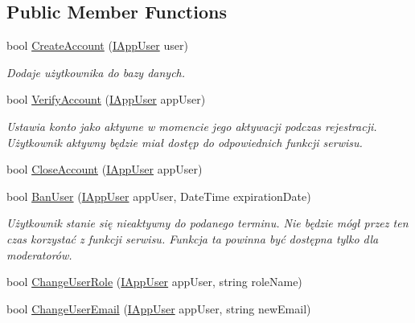 \subsection*{Public Member Functions}
\begin{DoxyCompactItemize}
\item 
bool \hyperlink{class_bibabook_1_1_implementation_1_1_app_user_service_1_1_users_service_a09099199f03613616cbb6b9881e2d613}{Create\+Account} (\hyperlink{interface_contract_1_1_i_app_user}{I\+App\+User} user)
\begin{DoxyCompactList}\small\item\em Dodaje użytkownika do bazy danych. \end{DoxyCompactList}\item 
bool \hyperlink{class_bibabook_1_1_implementation_1_1_app_user_service_1_1_users_service_abfc1fda74aa855425d06128ff4c57d0c}{Verify\+Account} (\hyperlink{interface_contract_1_1_i_app_user}{I\+App\+User} app\+User)
\begin{DoxyCompactList}\small\item\em Ustawia konto jako aktywne w momencie jego aktywacji podczas rejestracji. Użytkownik aktywny będzie miał dostęp do odpowiednich funkcji serwisu. \end{DoxyCompactList}\item 
bool \hyperlink{class_bibabook_1_1_implementation_1_1_app_user_service_1_1_users_service_a2467be014a736abc21385626434d390b}{Close\+Account} (\hyperlink{interface_contract_1_1_i_app_user}{I\+App\+User} app\+User)
\item 
bool \hyperlink{class_bibabook_1_1_implementation_1_1_app_user_service_1_1_users_service_a65c9624f8d564a1b1f306b38e8f9ad3d}{Ban\+User} (\hyperlink{interface_contract_1_1_i_app_user}{I\+App\+User} app\+User, Date\+Time expiration\+Date)
\begin{DoxyCompactList}\small\item\em Użytkownik stanie się nieaktywny do podanego terminu. Nie będzie mógł przez ten czas korzystać z funkcji serwisu. Funkcja ta powinna być dostępna tylko dla moderatorów. \end{DoxyCompactList}\item 
bool \hyperlink{class_bibabook_1_1_implementation_1_1_app_user_service_1_1_users_service_a718d33eb145f2d5bfc681a6d00b56749}{Change\+User\+Role} (\hyperlink{interface_contract_1_1_i_app_user}{I\+App\+User} app\+User, string role\+Name)
\item 
bool \hyperlink{class_bibabook_1_1_implementation_1_1_app_user_service_1_1_users_service_a8c0cea13f89ce8ae867eadc371c51024}{Change\+User\+Email} (\hyperlink{interface_contract_1_1_i_app_user}{I\+App\+User} app\+User, string new\+Email)

\end{DoxyCompactItemize}
